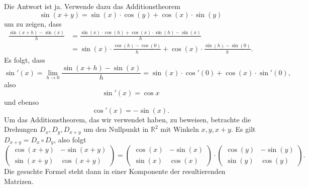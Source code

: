 \documentclass[../main.tex]{subfiles}
\begin{document}
Die Antwort ist ja. Verwende dazu das Additionstheorem
\[
  \sin(x + y) = \sin(x) \cdot \cos(y) + \cos(x) \cdot \sin(y)
\]
um zu zeigen, dass
\begin{align*}
  \frac{\sin( x + h ) - \sin(x)}{h}
  &=
  \frac{\sin(x) \cdot \cos(h) + \cos(x) \cdot \sin(h) - \sin(x)}{h}
  \\ & 
  = \sin(x) \cdot \frac{\cos(h) - \cos(0)}{h} + \cos(x) \cdot \frac{\sin(h) - \sin(0)}{h}.
\end{align*}
Es folgt, dass
\[
  \sin'(x) = \lim_{h \to 0} \frac{\sin(x + h) - \sin(x)}{h} =
  \sin(x) \cdot \cos'(0) + \cos(x) \cdot \sin' (0),
\]
also
\[
  \sin'(x) = \cos x
\]
und ebenso
\[
  \cos'(x) = -\sin(x).
\]
Um das Additionstheorem, das wir verwendet haben, zu beweisen,
betrachte die Drehungen $D_x, D_y, D_{x + y}$ um den Nullpunkt
in $\mathbb{R}^2$ mit Winkeln $x, y, x + y $.
Es gilt $D_{x + y} = D_x \circ D_y$, also folgt
\[
  \begin{pmatrix}
    \cos( x + y ) & - \sin(x + y) \\
    \sin( x + y ) & \cos(x + y)
  \end{pmatrix}
  =
  \begin{pmatrix}
    \cos(x) & -\sin(x) \\
    \sin(x) & \cos(x)
  \end{pmatrix}
  \cdot
  \begin{pmatrix}
    \cos(y) & -\sin(y) \\
    \sin(y) & \cos(y)
  \end{pmatrix}.
\]
Die gesuchte Formel steht dann in einer Komponente
der resultierenden Matrizen.
\end{document}
